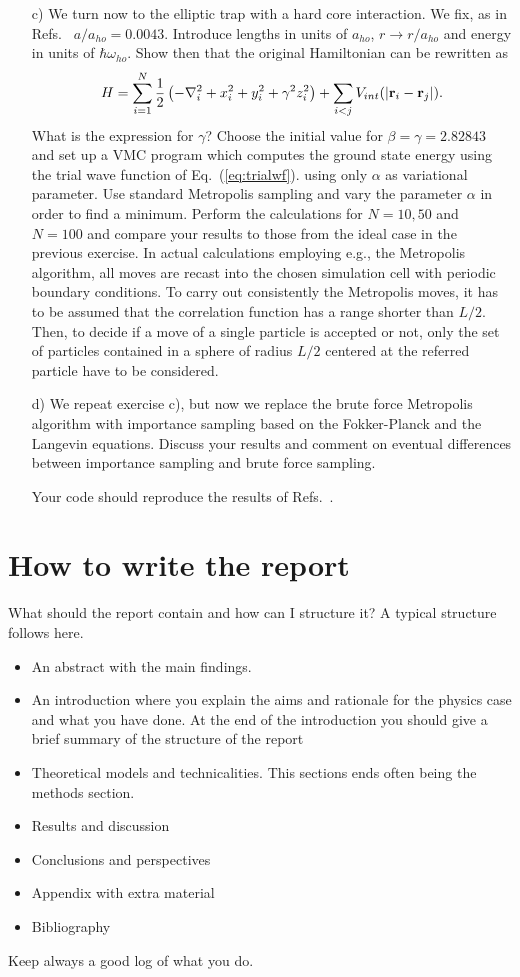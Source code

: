 \documentclass[10pt]{article}
\begin{document}
\begin{enumerate}
 \item[c)] We turn now to the elliptic trap with a hard core interaction. 
 We fix, as in Refs.~\cite{dubois2001,nilsen2005} $a/a_{ho}=0.0043$. Introduce lengths in units 
 of $a_{ho}$, $r\rightarrow r/a_{ho}$ and energy in units of $\hbar\omega_{ho}$.
 Show then that the original Hamiltonian can be rewritten as 
 \[ 
    H=\sum_{i=1}^N\frac{1}{2}\left(-\nabla^2_i+x_i^2+y_i^2+\gamma^2z_i^2\right)+\sum_{i<j}V_{int}(|{\bf r}_i-{\bf r}_j|).
 \]
 What is the expression for $\gamma$?
 Choose the initial value for $\beta=\gamma = 2.82843$ and set up a VMC program
 which computes the ground state energy using the trial wave function of Eq.~(\ref{eq:trialwf}). 
 using only $\alpha$ as variational parameter.
 Use standard Metropolis sampling and vary the parameter $\alpha$ in order to find a 
 minimum. Perform the calculations for $N=10,50$ and $N=100$ and compare your results to those from the ideal case in the previous exercise. 
In actual calculations employing e.g., the Metropolis algorithm,
all moves are recast into the chosen simulation cell with 
periodic boundary conditions. To carry out consistently the Metropolis moves,
it has to be assumed that the correlation function has a range shorter than
$L/2$. Then, to decide if a move of a single particle is accepted or not,
only the set of particles contained in a sphere of radius $L/2$ centered at the
referred particle have to be considered. 

\item[d)] We repeat exercise c), but now we replace the brute force Metropolis algorithm with 
importance sampling based on the Fokker-Planck and the Langevin equations. 
Discuss your results and comment on eventual differences between importance sampling and brute force sampling.

Your code should reproduce the results of Refs.~\cite{dubois2001,nilsen2005}.

\end{enumerate}



\section*{How to write the report}
What should the report contain and how can I structure it? A typical structure follows here.
\begin{itemize}
\item An abstract with the main findings.
\item  An introduction where you explain the aims and rationale for the physics case and what you have done. At the end of the introduction you should give a brief summary of the structure of the report
\item Theoretical models and technicalities. This sections ends often being the methods section.
\item Results and discussion
\item Conclusions and perspectives
\item Appendix with extra material
\item Bibliography
\end{itemize}
Keep always a good log of what you do.
\end{document}
